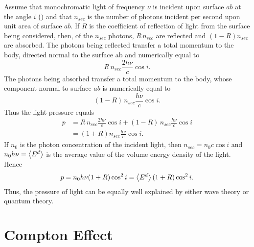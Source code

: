 Assume that monochromatic light of frequency $\nu$ is incident upon surface $ab$ at the angle $i$ () and that $n_{sec}$ is the number of photons incident per second upon unit area of surface $ab$. If $R$ is the coefficient of reflection  of light from the surface being considered, then, of the $n_{sec}$ photons, $R\, n_{sec}$
are reflected and $(1 - R) n_{sec}$ are absorbed. The photons being reflected transfer a total momentum to the body, directed normal to the surface ab and numerically equal to
\begin{equation*}%
R \, n_{sec} \frac{2 h \nu}{c} \cos i.
\end{equation*}
The photons being absorbed transfer a total momentum to the
body, whose component normal to surface $ab$ is numerically
equal to
\begin{equation*}%
(1 - R) \, n_{sec} \frac{ h \nu}{c} \cos i.
\end{equation*}
Thus the light pressure equals
\begin{align*}%
p & = R \, n_{sec} \frac{2 h \nu}{c} \cos i + (1 - R) \, n_{sec} \frac{ h \nu}{c} \cos i \\
& = (1 + R) n_{sec} \frac{ h \nu}{c} \cos i .
\end{align*}
If $n_{0}$ is the photon concentration of the incident light, then $n_{sec} = n_{0} c \cos i$ and $n_{0} h \nu = \expval{E^{d}}$ is the average value of the volume energy density of the light. Hence
\begin{equation*}%
p = n_{0} h \nu (1 + R) \cos^{2} i = \expval{E^{d}}(1 + R) \cos^{2} i.
\end{equation*}
Thus, the pressure of light can be equally well explained by
either wave theory  or quantum theory.

\section{Compton Effect}
\label{sec-37.3}

